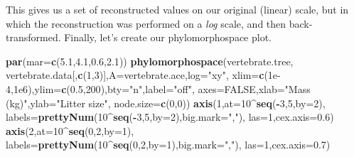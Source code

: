 \documentclass[fleqn,10pt,lineno]{wlpeerj} %
\newenvironment{Shaded}{\begin{snugshade}}{\end{snugshade}}
\newcommand{\AttributeTok}[1]{\textcolor[rgb]{0.13,0.29,0.53}{#1}}
\newcommand{\ConstantTok}[1]{\textcolor[rgb]{0.56,0.35,0.01}{#1}}
\newcommand{\DecValTok}[1]{\textcolor[rgb]{0.00,0.00,0.81}{#1}}
\newcommand{\FloatTok}[1]{\textcolor[rgb]{0.00,0.00,0.81}{#1}}
\newcommand{\FunctionTok}[1]{\textcolor[rgb]{0.13,0.29,0.53}{\textbf{#1}}}
\newcommand{\NormalTok}[1]{#1}
\newcommand{\SpecialCharTok}[1]{\textcolor[rgb]{0.81,0.36,0.00}{\textbf{#1}}}
\newcommand{\StringTok}[1]{\textcolor[rgb]{0.31,0.60,0.02}{#1}}
\begin{document}
This gives us a set of reconstructed values on our original (linear) scale, but in which the reconstruction was performed on a \emph{log} scale, and then back-transformed. Finally, let's create our phylomorphospace plot.

\begin{Shaded}
\begin{Highlighting}[]
\FunctionTok{par}\NormalTok{(}\AttributeTok{mar=}\FunctionTok{c}\NormalTok{(}\FloatTok{5.1}\NormalTok{,}\FloatTok{4.1}\NormalTok{,}\FloatTok{0.6}\NormalTok{,}\FloatTok{2.1}\NormalTok{))}
\FunctionTok{phylomorphospace}\NormalTok{(vertebrate.tree,}
\NormalTok{  vertebrate.data[,}\FunctionTok{c}\NormalTok{(}\DecValTok{1}\NormalTok{,}\DecValTok{3}\NormalTok{)],}\AttributeTok{A=}\NormalTok{vertebrate.ace,}\AttributeTok{log=}\StringTok{"xy"}\NormalTok{,}
  \AttributeTok{xlim=}\FunctionTok{c}\NormalTok{(}\FloatTok{1e{-}4}\NormalTok{,}\FloatTok{1e6}\NormalTok{),}\AttributeTok{ylim=}\FunctionTok{c}\NormalTok{(}\FloatTok{0.5}\NormalTok{,}\DecValTok{200}\NormalTok{),}\AttributeTok{bty=}\StringTok{"n"}\NormalTok{,}\AttributeTok{label=}\StringTok{"off"}\NormalTok{,}
  \AttributeTok{axes=}\ConstantTok{FALSE}\NormalTok{,}\AttributeTok{xlab=}\StringTok{"Mass (kg)"}\NormalTok{,}\AttributeTok{ylab=}\StringTok{"Litter size"}\NormalTok{,}
  \AttributeTok{node.size=}\FunctionTok{c}\NormalTok{(}\DecValTok{0}\NormalTok{,}\DecValTok{0}\NormalTok{))}
\FunctionTok{axis}\NormalTok{(}\DecValTok{1}\NormalTok{,}\AttributeTok{at=}\DecValTok{10}\SpecialCharTok{\^{}}\FunctionTok{seq}\NormalTok{(}\SpecialCharTok{{-}}\DecValTok{3}\NormalTok{,}\DecValTok{5}\NormalTok{,}\AttributeTok{by=}\DecValTok{2}\NormalTok{),}
  \AttributeTok{labels=}\FunctionTok{prettyNum}\NormalTok{(}\DecValTok{10}\SpecialCharTok{\^{}}\FunctionTok{seq}\NormalTok{(}\SpecialCharTok{{-}}\DecValTok{3}\NormalTok{,}\DecValTok{5}\NormalTok{,}\AttributeTok{by=}\DecValTok{2}\NormalTok{),}\AttributeTok{big.mark=}\StringTok{","}\NormalTok{),}
  \AttributeTok{las=}\DecValTok{1}\NormalTok{,}\AttributeTok{cex.axis=}\FloatTok{0.6}\NormalTok{)}
\FunctionTok{axis}\NormalTok{(}\DecValTok{2}\NormalTok{,}\AttributeTok{at=}\DecValTok{10}\SpecialCharTok{\^{}}\FunctionTok{seq}\NormalTok{(}\DecValTok{0}\NormalTok{,}\DecValTok{2}\NormalTok{,}\AttributeTok{by=}\DecValTok{1}\NormalTok{),}
  \AttributeTok{labels=}\FunctionTok{prettyNum}\NormalTok{(}\DecValTok{10}\SpecialCharTok{\^{}}\FunctionTok{seq}\NormalTok{(}\DecValTok{0}\NormalTok{,}\DecValTok{2}\NormalTok{,}\AttributeTok{by=}\DecValTok{1}\NormalTok{),}\AttributeTok{big.mark=}\StringTok{","}\NormalTok{),}
  \AttributeTok{las=}\DecValTok{1}\NormalTok{,}\AttributeTok{cex.axis=}\FloatTok{0.7}\NormalTok{)}

\end{Highlighting}
\end{Shaded}
\end{document}
